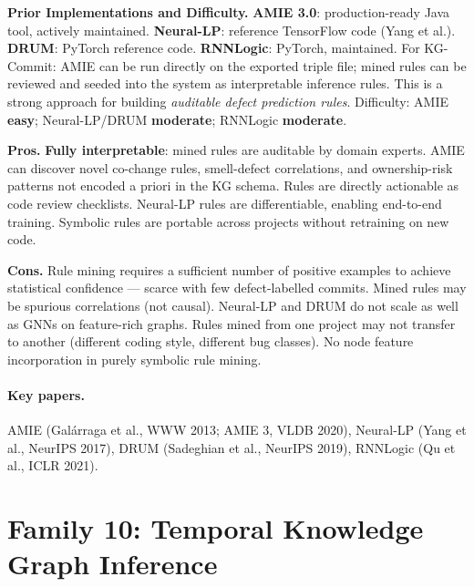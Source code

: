 \documentclass[12pt,a4paper]{article}
\begin{document}
\begin{implbox}
\textbf{Prior Implementations and Difficulty.}
\textbf{AMIE 3.0}: production-ready Java tool, actively maintained.
\textbf{Neural-LP}: reference TensorFlow code (Yang et al.).
\textbf{DRUM}: PyTorch reference code.
\textbf{RNNLogic}: PyTorch, maintained.
For KG-Commit: AMIE can be run directly on the exported triple file; mined
rules can be reviewed and seeded into the system as interpretable inference
rules. This is a strong approach for building \emph{auditable defect
prediction rules}. Difficulty: AMIE \textbf{easy}; Neural-LP/DRUM
\textbf{moderate}; RNNLogic \textbf{moderate}.
\end{implbox}

\begin{prosbox}
\textbf{Pros.}
\textbf{Fully interpretable}: mined rules are auditable by domain experts.
AMIE can discover novel co-change rules, smell-defect correlations, and
ownership-risk patterns not encoded a priori in the KG schema. Rules are
directly actionable as code review checklists. Neural-LP rules are
differentiable, enabling end-to-end training. Symbolic rules are portable
across projects without retraining on new code.
\end{prosbox}

\begin{consbox}
\textbf{Cons.}
Rule mining requires a sufficient number of positive examples to achieve
statistical confidence --- scarce with few defect-labelled commits.
Mined rules may be spurious correlations (not causal). Neural-LP and DRUM
do not scale as well as GNNs on feature-rich graphs. Rules mined from one
project may not transfer to another (different coding style, different bug
classes). No node feature incorporation in purely symbolic rule mining.
\end{consbox}

\paragraph{Key papers.} AMIE (Gal\'{a}rraga et al., WWW 2013; AMIE 3, VLDB 2020),
Neural-LP (Yang et al., NeurIPS 2017), DRUM (Sadeghian et al., NeurIPS 2019),
RNNLogic (Qu et al., ICLR 2021).

\section{Family 10: Temporal Knowledge Graph Inference}
\end{document}
